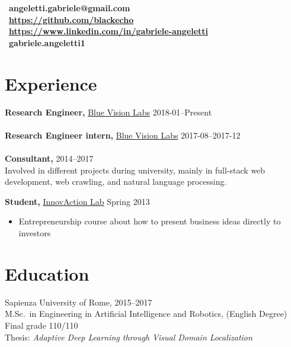 \documentclass[margin]{res}
\begin{document}
    \address{London, UK  \\ (+44) 7803 056685}
    \begin{resume}
        \section{}
        \faEnvelope~\textbf{angeletti.gabriele@gmail.com} \\[5pt]
        \faGithub~\textbf{\url{https://github.com/blackecho}} \\[5pt]
        \faLinkedin~\textbf{\url{https://www.linkedin.com/in/gabriele-angeletti}} \\[5pt]
        \faSkype~\textbf{gabriele.angeletti1}

        \section{Experience}
            {\bf Research Engineer,} \href{http://www.bluevisionlabs.com}{Blue Vision Labs} \hfill 2018-01--Present\\
            \\
            {\bf Research Engineer intern,} \href{http://www.bluevisionlabs.com}{Blue Vision Labs} \hfill 2017-08--2017-12\\
            \\
            {\bf Consultant,} \hfill 2014--2017\\
            Involved in different projects during university, mainly in full-stack web development,
            web crawling, and natural language processing.

            {\bf Student,} \href{http://www.innovactionlab.org/?lang=en}{InnovAction Lab} \hfill Spring 2013
            \begin{itemize} \itemsep-2pt
                \item Entrepreneurship course about how to present business ideas directly to investors
            \end{itemize}

        \section{Education}
            Sapienza University of Rome, \hfill 2015--2017 \\
            M.Sc.\ in Engineering in Artificial Intelligence and Robotics, (English Degree) \\
            Final grade 110/110 \\
            Thesis: \textit{Adaptive Deep Learning through Visual Domain Localization}


\end{resume}
\end{document}
